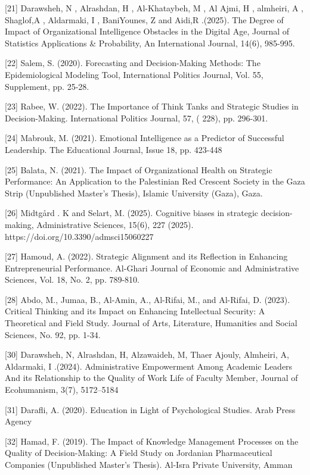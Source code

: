 \documentclass[10pt]{NSP1}
\begin{document}
[21] Darawsheh, N , Alrashdan, H , Al-Khataybeh, M , Al Ajmi, H , almheiri, A , Shaglof,A , Aldarmaki, I , BaniYounes, Z and Aidi,R .(2025). The Degree of Impact of Organizational Intelligence Obstacles in the Digital Age, Journal of Statistics Applications \& Probability, An International Journal, 14(6), 985-995.

[22] Salem, S. (2020). Forecasting and Decision-Making Methods: The Epidemiological Modeling Tool, International Politics Journal, Vol. 55, Supplement, pp. 25-28.

[23] Rabee, W. (2022). The Importance of Think Tanks and Strategic Studies in Decision-Making. International Politics Journal, 57, ( 228), pp. 296-301.

[24] Mabrouk, M. (2021). Emotional Intelligence as a Predictor of Successful Leadership. The Educational Journal, Issue 18, pp. 423-448

[25] Balata, N. (2021). The Impact of Organizational Health on Strategic Performance: An Application to the Palestinian Red Crescent Society in the Gaza Strip (Unpublished Master's Thesis), Islamic University (Gaza), Gaza.

[26] Midtgård . K and Selart, M. (2025). Cognitive biases in strategic decision-making, Administrative Sciences, 15(6), 227 (2025). https://doi.org/10.3390/admsci15060227

[27] Hamoud, A. (2022). Strategic Alignment and its Reflection in Enhancing Entrepreneurial Performance. Al-Ghari Journal of Economic and Administrative Sciences, Vol. 18, No. 2, pp. 789-810.

[28] Abdo, M., Jumaa, B., Al-Amin, A., Al-Rifai, M., and Al-Rifai, D. (2023). Critical Thinking and its Impact on Enhancing Intellectual Security: A Theoretical and Field Study. Journal of Arts, Literature, Humanities and Social Sciences, No. 92, pp. 1-34.

[30] Darawsheh, N, Alrashdan, H, Alzawaideh, M, Thaer Ajouly, Almheiri, A, Aldarmaki, I .(2024). Administrative Empowerment Among Academic Leaders And its Relationship to the Quality of Work Life of Faculty Member, Journal of Ecohumanism, 3(7), 5172–5184

[31] Darafli, A. (2020). Education in Light of Psychological Studies. Arab Press Agency

[32] Hamad, F. (2019). The Impact of Knowledge Management Processes on the Quality of Decision-Making: A Field Study on Jordanian Pharmaceutical Companies (Unpublished Master's Thesis). Al-Isra Private University, Amman
\end{document}
